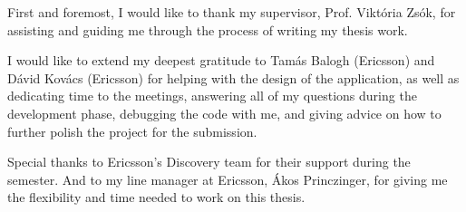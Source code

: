 First and foremost, I would like to thank my supervisor, Prof. Viktória Zsók, for assisting and guiding me through the process of writing my thesis work. 

I would like to extend my deepest gratitude to Tamás Balogh (Ericsson) and Dávid Kovács (Ericsson) for helping with the design of the application, as well as dedicating time to the meetings, answering all of my questions during the development phase, debugging the code with me, and giving advice on how to further polish the project for the submission.

Special thanks to Ericsson's Discovery team for their support during the semester. And to my line manager at Ericsson, Ákos Princzinger, for giving me the flexibility and time needed to work on this thesis. 
